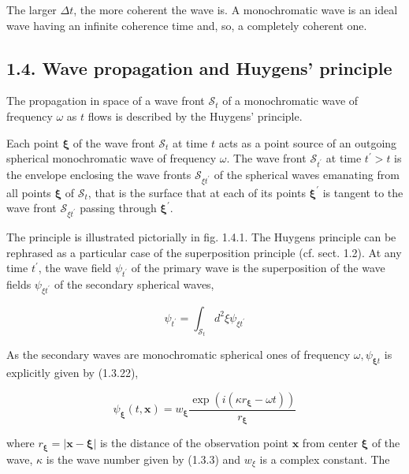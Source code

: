 \documentclass{article}
\begin{document}
The larger $\Delta t$, the more coherent the wave is. A monochromatic wave is an ideal wave having an infinite coherence time and, so, a completely coherent one.

\subsection*{1.4. Wave propagation and Huygens' principle}

The propagation in space of a wave front $\mathcal{S}_{t}$ of a monochromatic wave of frequency $\omega$ as $t$ flows is described by the Huygens' principle.

Each point $\boldsymbol{\xi}$ of the wave front $\mathcal{S}_{t}$ at time $t$ acts as a point source of an outgoing spherical monochromatic wave of frequency $\omega$. The wave front $\mathcal{S}_{t^{\prime}}$ at time $t^{\prime}>t$ is the envelope enclosing the wave fronts $\mathcal{S}_{\xi t^{\prime}}$ of the spherical waves emanating from all points $\boldsymbol{\xi}$ of $\mathcal{S}_{t}$, that is the surface that at each of its points $\boldsymbol{\xi}^{\prime}$ is tangent to the wave front $\mathcal{S}_{\xi t^{\prime}}$ passing through $\boldsymbol{\xi}^{\prime}$.

The principle is illustrated pictorially in fig. 1.4.1.
The Huygens principle can be rephrased as a particular case of the superposition principle (cf. sect. 1.2). At any time $t^{\prime}$, the wave field $\psi_{t^{\prime}}$ of the primary wave is the superposition of the wave fields $\psi_{\xi t^{\prime}}$ of the secondary spherical waves,
 
\begin{equation*}
\psi_{t^{\prime}}=\int_{\mathcal{S}_{t}} d^{2} \xi \psi_{\xi t^{\prime}} \tag{1.4.1}
\end{equation*}
 

As the secondary waves are monochromatic spherical ones of frequency $\omega, \psi_{\boldsymbol{\xi} t}$ is explicitly given by (1.3.22),
 
\begin{equation*}
\psi_{\boldsymbol{\xi}}(t, \boldsymbol{x})=w_{\boldsymbol{\xi}} \frac{\exp \left(i\left(\kappa r_{\boldsymbol{\xi}}-\omega t\right)\right)}{r_{\boldsymbol{\xi}}} \tag{1.4.2}
\end{equation*}
 
where $r_{\boldsymbol{\xi}}=|\boldsymbol{x}-\boldsymbol{\xi}|$ is the distance of the observation point $\boldsymbol{x}$ from center $\boldsymbol{\xi}$ of the wave, $\kappa$ is the wave number given by (1.3.3) and $w_{\xi}$ is a complex constant. The
\end{document}
